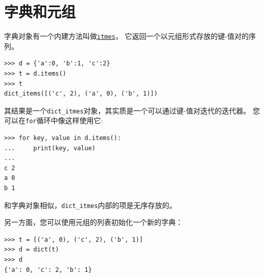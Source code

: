 %
        


\section{字典和元组}
\label{dictuple}
 
 


字典对象有一个内建方法叫做\href{https://docs.python.org/3/library/stdtypes.html?highlight=items#dict.items}{\lstinline{itmes}}， 它返回一个以元组形式存放的键-值对的序列。

\begin{lstlisting}
>>> d = {'a':0, 'b':1, 'c':2}
>>> t = d.items()
>>> t
dict_items([('c', 2), ('a', 0), ('b', 1)])
\end{lstlisting}

%

其结果是一个\lstinline{dict_itmes}对象，其实质是一个可以通过键-值对迭代的迭代器。 您可以在\lstinline{for}循环中像这样使用它:

\begin{lstlisting}
>>> for key, value in d.items():
...     print(key, value)
...
c 2
a 0
b 1
\end{lstlisting}

%

和字典对象相似，\lstinline{dict_itmes}内部的项是无序存放的。


另一方面，您可以使用元组的列表初始化一个新的字典：

\begin{lstlisting}
>>> t = [('a', 0), ('c', 2), ('b', 1)]
>>> d = dict(t)
>>> d
{'a': 0, 'c': 2, 'b': 1}
\end{lstlisting}

